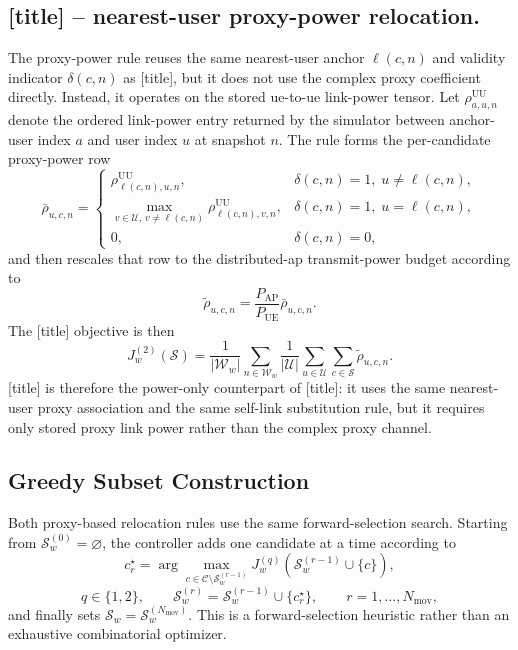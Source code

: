 \subsection{\texorpdfstring{[title] -- nearest-user proxy-power relocation.}{Distributed movable proxy-power relocation.}}
The proxy-power rule reuses the same nearest-user anchor $\ell(c,n)$ and validity indicator $\delta(c,n)$ as [title], but it does not use the complex proxy coefficient directly. Instead, it operates on the stored \gls{ue}-to-\gls{ue} link-power tensor. Let $\rho^{\mathrm{UU}}_{a,u,n}$ denote the ordered link-power entry returned by the simulator between anchor-user index $a$ and user index $u$ at snapshot $n$. The rule forms the per-candidate proxy-power row
\begin{equation}
    \bar{\rho}_{u,c,n} =
    \begin{cases}
        \rho^{\mathrm{UU}}_{\ell(c,n),u,n}, & \delta(c,n)=1,\; u \neq \ell(c,n), \\
        \max_{v \in \mathcal{U},\, v\neq \ell(c,n)} \rho^{\mathrm{UU}}_{\ell(c,n),v,n}, & \delta(c,n)=1,\; u = \ell(c,n), \\
        0, & \delta(c,n)=0,
    \end{cases}
\end{equation}
and then rescales that row to the distributed-\gls{ap} transmit-power budget according to
\begin{equation}
    \tilde{\rho}_{u,c,n} =
    \frac{P_{\mathrm{AP}}}{P_{\mathrm{UE}}}\bar{\rho}_{u,c,n}.
\end{equation}
The [title] objective is then
\begin{equation}
    J_w^{(2)}(\mathcal{S}) =
    \frac{1}{|\mathcal{W}_w|}
    \sum_{n \in \mathcal{W}_w}
    \frac{1}{|\mathcal{U}|}
    \sum_{u \in \mathcal{U}}
    \sum_{c \in \mathcal{S}}
    \tilde{\rho}_{u,c,n}.
\end{equation}
[title] is therefore the power-only counterpart of [title]: it uses the same nearest-user proxy association and the same self-link substitution rule, but it requires only stored proxy link power rather than the complex proxy channel.

\subsection{Greedy Subset Construction}
Both proxy-based relocation rules use the same forward-selection search. Starting from $\mathcal{S}_w^{(0)}=\varnothing$, the controller adds one candidate at a time according to
\begin{equation}
    c_r^\star =
    \arg\max_{c \in \mathcal{C}\setminus \mathcal{S}_w^{(r-1)}}
    J_w^{(q)}\!\left(\mathcal{S}_w^{(r-1)} \cup \{c\}\right),
\end{equation}
\begin{equation}
    q \in \{1,2\},
    \qquad
    \mathcal{S}_w^{(r)} =
    \mathcal{S}_w^{(r-1)} \cup \{c_r^\star\},
    \qquad r=1,\ldots,N_{\mathrm{mov}},
\end{equation}
and finally sets $\mathcal{S}_w=\mathcal{S}_w^{(N_{\mathrm{mov}})}$. This is a forward-selection heuristic rather than an exhaustive combinatorial optimizer.

